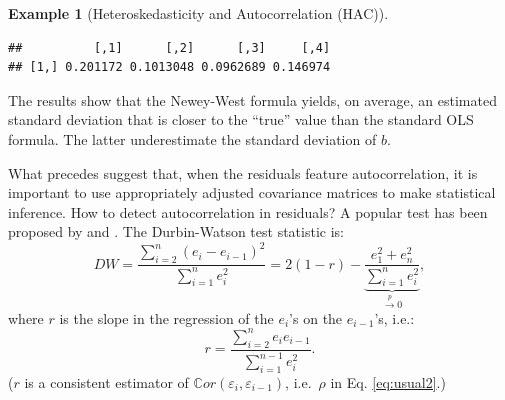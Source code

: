 \documentclass[
  12pt,
]{book}
\newenvironment{Shaded}{\begin{snugshade}}{\end{snugshade}}
\newcommand{\CommentTok}[1]{\textcolor[rgb]{0.56,0.35,0.01}{\textit{#1}}}
\newcommand{\DecValTok}[1]{\textcolor[rgb]{0.00,0.00,0.81}{#1}}
\newcommand{\FunctionTok}[1]{\textcolor[rgb]{0.00,0.00,0.00}{#1}}
\newcommand{\NormalTok}[1]{#1}
\newcommand{\OtherTok}[1]{\textcolor[rgb]{0.56,0.35,0.01}{#1}}
\newcommand{\SpecialCharTok}[1]{\textcolor[rgb]{0.00,0.00,0.00}{#1}}
\theoremstyle{definition}
\theoremstyle{definition}
\newtheorem{example}{Example}[chapter]
\theoremstyle{definition}
\theoremstyle{definition}
\theoremstyle{remark}
\begin{document}
\begin{example}[Heteroskedasticity and Autocorrelation (HAC)]
\begin{Shaded}
\end{Shaded}

\begin{verbatim}
##          [,1]      [,2]      [,3]     [,4]
## [1,] 0.201172 0.1013048 0.0962689 0.146974
\end{verbatim}

The results show that the Newey-West formula yields, on average, an estimated standard deviation that is closer to the ``true'' value than the standard OLS formula. The latter underestimate the standard deviation of \(b\).
\end{example}

What precedes suggest that, when the residuals feature autocorrelation, it is important to use appropriately adjusted covariance matrices to make statistical inference. How to detect autocorrelation in residuals? A popular test has been proposed by \citet{Durbin_Watson_1950} and \citet{Durbin_Watson_1951}. The Durbin-Watson test statistic is:
\[
DW = \frac{\sum_{i=2}^{n}(e_i - e_{i-1})^2}{\sum_{i=1}^{n}e_i^2}= 2(1 - r) - \underbrace{\frac{e_1^2 + e_n^2}{\sum_{i=1}^{n}e_i^2}}_{\overset{p}{\rightarrow} 0},
\]
where \(r\) is the slope in the regression of the \(e_i\)'s on the \(e_{i-1}\)'s, i.e.:
\[
r = \frac{\sum_{i=2}^{n}e_i e_{i-1}}{\sum_{i=1}^{n-1}e_i^2}.
\]
(\(r\) is a consistent estimator of \(\mathbb{C}or(\varepsilon_i,\varepsilon_{i-1})\), i.e.~\(\rho\) in Eq. \eqref{eq:usual2}.)
\end{document}
